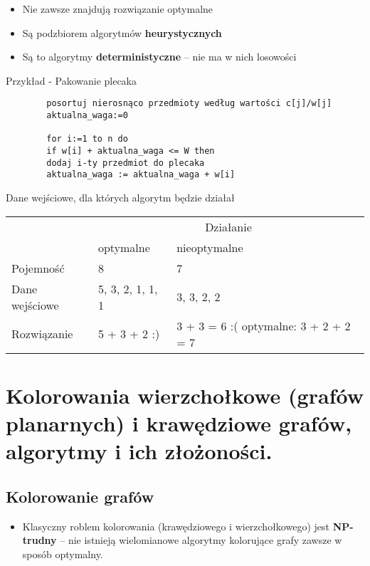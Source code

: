 \documentclass[main.tex]{subfiles}
\begin{document}
    \begin{itemize}[noitemsep]
        \item Nie zawsze znajdują rozwiązanie optymalne
        \item Są podzbiorem algorytmów \textbf{heurystycznych}
        \item Są to algorytmy \textbf{deterministyczne} – nie ma w nich losowości
    \end{itemize}

    Przykład - Pakowanie plecaka

    \begin{verbatim}
        posortuj nierosnąco przedmioty według wartości c[j]/w[j]
        aktualna_waga:=0

        for i:=1 to n do
        if w[i] + aktualna_waga <= W then
        dodaj i-ty przedmiot do plecaka
        aktualna_waga := aktualna_waga + w[i]
    \end{verbatim}

    Dane wejściowe, dla których algorytm będzie działał

    \begin{table}[H]
        \begin{center}
            \begin{tabular}{| p{5cm} | p{5cm}  | p{5cm}|}
                \hline
                &\multicolumn{2}{c|}{Działanie}\\
                &optymalne & nieoptymalne\\
                \hline
                \hline
                Pojemność & 8 & 7\\
                \hline
                Dane wejściowe & 5, 3, 2, 1, 1, 1 & 3, 3, 2, 2\\
                \hline
                Rozwiązanie & 5 + 3 + 2 :) & 3 + 3 = 6 :( \vskip 0mm optymalne: 3 + 2 + 2 = 7\\
                \hline
            \end{tabular}
        \end{center}
    \end{table}


    \section{Kolorowania wierzchołkowe (grafów planarnych) i krawędziowe grafów, algorytmy i ich złożoności.}

    \subsection{Kolorowanie grafów}
    \begin{itemize}
        \item Klasyczny roblem kolorowania (krawędziowego i wierzchołkowego) jest \textbf{NP-trudny} – nie istnieją
        wielomianowe algorytmy kolorujące grafy zawsze w sposób optymalny.
    \end{itemize}
\end{document}
